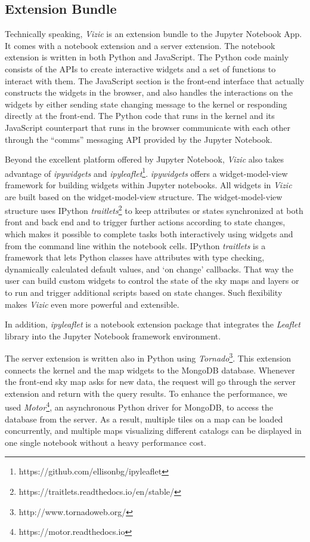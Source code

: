 \documentclass[../vis.tex]{subfiles}
\begin{document}
\subsection{Extension Bundle}
\label{extension}
Technically speaking, \textit{Vizic} is an extension bundle to the Jupyter Notebook App. It comes with a notebook extension and a server extension.
The notebook extension is written in both Python and JavaScript. The Python code mainly consists of the APIs to create interactive widgets and a set of functions to interact with them.
The JavaScript section is the front-end interface that actually constructs the widgets in the browser, and also handles the interactions on the widgets by either sending state changing message to the kernel or responding directly at the front-end.
The Python code that runs in the kernel and its JavaScript counterpart that runs in the browser communicate with each other through the ``comms'' messaging API provided by the Jupyter Notebook.

Beyond the excellent platform offered by Jupyter Notebook, \textit{Vizic} also takes advantage of \textit{ipywidgets} and \textit{ipyleaflet}\footnote{https://github.com/ellisonbg/ipyleaflet}.
\textit{ipywidgets} offers a widget-model-view framework for building widgets within Jupyter notebooks.
All widgets in \textit{Vizic} are built based on the widget-model-view structure.
The widget-model-view structure uses IPython \textit{traitlets}\footnote{https://traitlets.readthedocs.io/en/stable/} to keep attributes or states synchronized at both front and back end and to trigger further actions according to state changes, which makes it possible to complete tasks both interactively using widgets and from the command line within the notebook cells.
IPython \textit{traitlets} is a framework that lets Python classes have attributes with type checking, dynamically calculated default values, and ‘on change’ callbacks. That way the user can build custom widgets to control the state of the sky maps and layers or to run and trigger additional scripts based on state changes. Such flexibility makes \textit{Vizic} even more powerful and extensible.

In addition, \textit{ipyleaflet} is a notebook extension package that integrates the \textit{Leaflet} library into the Jupyter Notebook framework environment.

The server extension is written also in Python using \textit{Tornado}\footnote{http://www.tornadoweb.org/}. This extension connects the kernel and the map widgets to the MongoDB database.
Whenever the front-end sky map asks for new data, the request will go through the server extension and return with the query results.
To enhance the performance, we used \textit{Motor}\footnote{https://motor.readthedocs.io}, an asynchronous Python driver for MongoDB, to access the database from the server.
As a result, multiple tiles on a map can be loaded concurrently, and multiple maps visualizing different catalogs can be displayed in one single notebook without a heavy performance cost.
\end{document}
